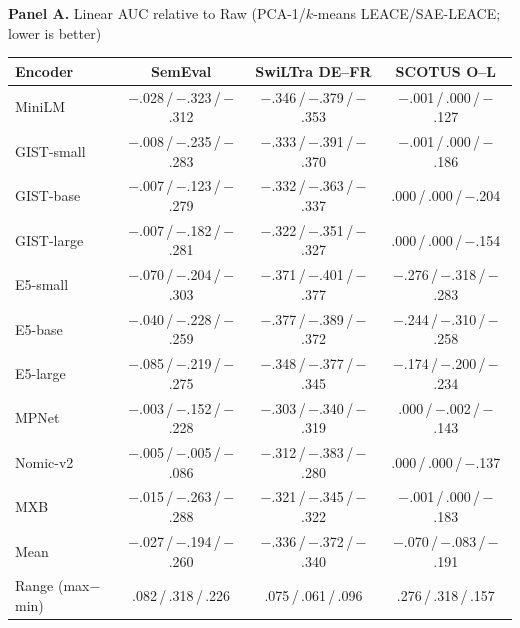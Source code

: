 \begingroup
\centering
\footnotesize
\setlength{\tabcolsep}{5pt}
\renewcommand{\arraystretch}{0.90}


\par{\textbf{Panel A.} Linear AUC relative to Raw (PCA-1/$k$-means LEACE/SAE-LEACE; lower is better)}\par\vspace{1pt}
\begin{tabular}{lccc}
\toprule
Encoder & \multicolumn{1}{c}{SemEval} & \multicolumn{1}{c}{SwiLTra DE--FR} & \multicolumn{1}{c}{SCOTUS O--L} \\
\midrule
MiniLM & $-$.028\,/\,$-$.323\,/\,$-$.312 & $-$.346\,/\,$-$.379\,/\,$-$.353 & $-$.001\,/\,.000\,/\,$-$.127 \\
\addlinespace[1pt]
GIST-small & $-$.008\,/\,$-$.235\,/\,$-$.283 & $-$.333\,/\,$-$.391\,/\,$-$.370 & $-$.001\,/\,.000\,/\,$-$.186 \\
GIST-base & $-$.007\,/\,$-$.123\,/\,$-$.279 & $-$.332\,/\,$-$.363\,/\,$-$.337 & .000\,/\,.000\,/\,$-$.204 \\
GIST-large & $-$.007\,/\,$-$.182\,/\,$-$.281 & $-$.322\,/\,$-$.351\,/\,$-$.327 & .000\,/\,.000\,/\,$-$.154 \\
\addlinespace[1pt]
E5-small & $-$.070\,/\,$-$.204\,/\,$-$.303 & $-$.371\,/\,$-$.401\,/\,$-$.377 & $-$.276\,/\,$-$.318\,/\,$-$.283 \\
E5-base & $-$.040\,/\,$-$.228\,/\,$-$.259 & $-$.377\,/\,$-$.389\,/\,$-$.372 & $-$.244\,/\,$-$.310\,/\,$-$.258 \\
E5-large & $-$.085\,/\,$-$.219\,/\,$-$.275 & $-$.348\,/\,$-$.377\,/\,$-$.345 & $-$.174\,/\,$-$.200\,/\,$-$.234 \\
\addlinespace[1pt]
MPNet & $-$.003\,/\,$-$.152\,/\,$-$.228 & $-$.303\,/\,$-$.340\,/\,$-$.319 & .000\,/\,$-$.002\,/\,$-$.143 \\
Nomic-v2 & $-$.005\,/\,$-$.005\,/\,$-$.086 & $-$.312\,/\,$-$.383\,/\,$-$.280 & .000\,/\,.000\,/\,$-$.137 \\
MXB & $-$.015\,/\,$-$.263\,/\,$-$.288 & $-$.321\,/\,$-$.345\,/\,$-$.322 & $-$.001\,/\,.000\,/\,$-$.183 \\
\midrule
Mean & $-$.027\,/\,$-$.194\,/\,$-$.260 & $-$.336\,/\,$-$.372\,/\,$-$.340 & $-$.070\,/\,$-$.083\,/\,$-$.191 \\
Range (max$-$min) & .082\,/\,.318\,/\,.226 & .075\,/\,.061\,/\,.096 & .276\,/\,.318\,/\,.157 \\
\bottomrule
\end{tabular}

